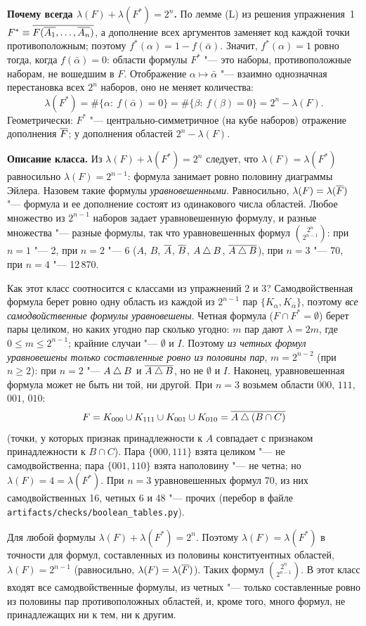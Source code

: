 \begin{solution}[7 (\S\,3)]
\textbf{Почему всегда $\lambda(F)+\lambda(F^*)=2^n$.} По лемме (L) из
решения упражнения~1 $F^*\equiv\overline{F(\overline{A_1},\dots,\overline{A_n})}$, а дополнение
всех аргументов заменяет код каждой точки противоположным; поэтому
$f^*(\alpha)=1-f(\bar\alpha)$. Значит, $f^*(\alpha)=1$ ровно тогда, когда
$f(\bar\alpha)=0$: области формулы $F^*$ "--- это наборы, противоположные
наборам, не вошедшим в $F$. Отображение $\alpha\mapsto\bar\alpha$ "--- взаимно
однозначная перестановка всех $2^n$ наборов, оно не меняет количества:
\[
\lambda(F^*)=\#\{\alpha:\ f(\bar\alpha)=0\}=\#\{\beta:\ f(\beta)=0\}=2^n-\lambda(F).
\]
Геометрически: $F^*$ "--- центрально-симметричное (на кубе наборов) отражение
дополнения $\overline{F}$; у дополнения областей $2^n-\lambda(F)$.

\textbf{Описание класса.} Из $\lambda(F)+\lambda(F^*)=2^n$ следует, что
$\lambda(F)=\lambda(F^*)$ равносильно $\lambda(F)=2^{n-1}$: формула занимает
ровно половину диаграммы Эйлера. Назовем такие формулы
\emph{уравновешенными}. Равносильно, $\lambda(F)=\lambda(\overline{F})$ "--- формула
и ее дополнение состоят из одинакового числа областей. Любое множество из
$2^{n-1}$ наборов задает уравновешенную формулу, и разные множества "---
разные формулы, так что уравновешенных формул
$\binom{2^n}{2^{n-1}}$: при $n=1$ "--- 2, при $n=2$ "--- 6 ($A$, $B$, $\overline{A}$,
$\overline{B}$, $A\mathbin{\triangle} B$, $\overline{A\mathbin{\triangle} B}$), при $n=3$ "--- 70, при $n=4$ "--- 12\,870.

Как этот класс соотносится с классами из упражнений 2 и 3? Самодвойственная
формула берет ровно одну область из каждой из $2^{n-1}$ пар
$\{K_\alpha,K_{\bar\alpha}\}$, поэтому \emph{все самодвойственные формулы
уравновешены}. Четная формула ($F\cap F^*=\emptyset$) берет пары целиком, но
каких угодно пар сколько угодно: $m$ пар дают $\lambda=2m$, где
$0\le m\le2^{n-1}$; крайние случаи "--- $\emptyset$ и $I$. Поэтому \emph{из
четных формул уравновешены только составленные ровно из половины пар},
$m=2^{n-2}$ (при $n\ge2$): при $n=2$ "--- $A\mathbin{\triangle} B$ и $\overline{A\mathbin{\triangle} B}$, но не
$\emptyset$ и $I$. Наконец, уравновешенная формула может не быть ни той, ни
другой. При $n=3$ возьмем области $000$, $111$, $001$, $010$:
\[
F=K_{000}\cup K_{111}\cup K_{001}\cup K_{010}=\overline{A\mathbin{\triangle}(B\cap C)}
\]
(точки, у которых признак принадлежности к $A$ совпадает с признаком
принадлежности к $B\cap C$). Пара $\{000,111\}$ взята целиком "---
не самодвойственна; пара $\{001,110\}$ взята наполовину "--- не четна; но
$\lambda(F)=4=\lambda(F^*)$. При $n=3$ уравновешенных формул 70, из них
самодвойственных 16, четных 6 и 48 "--- прочих (перебор в файле
\texttt{artifacts/checks/boolean\_tables.py}).

\answer Для любой формулы $\lambda(F)+\lambda(F^*)=2^n$. Поэтому
$\lambda(F)=\lambda(F^*)$ в точности для формул, составленных из половины
конституентных областей, $\lambda(F)=2^{n-1}$ (равносильно,
$\lambda(F)=\lambda(\overline{F})$). Таких формул $\binom{2^n}{2^{n-1}}$. В этот класс
входят все самодвойственные формулы, из четных "--- только составленные
ровно из половины пар противоположных областей, и, кроме того, много
формул, не принадлежащих ни к тем, ни к другим.
\end{solution}
